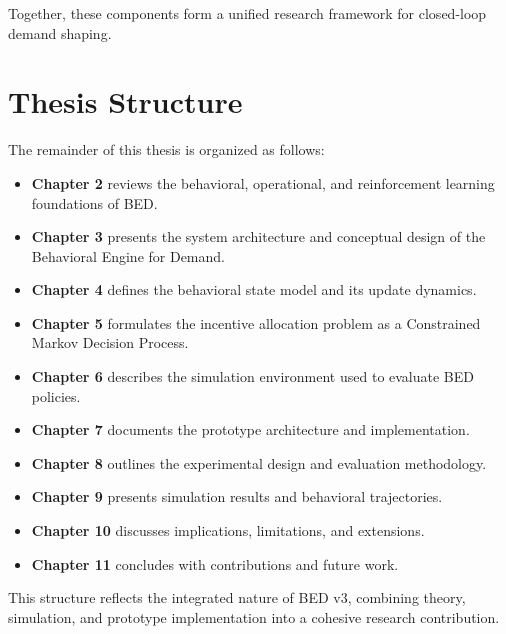 Together, these components form a unified research framework for closed-loop
demand shaping.

\section{Thesis Structure}

The remainder of this thesis is organized as follows:

\begin{itemize}
    \item \textbf{Chapter 2} reviews the behavioral, operational, and
    reinforcement learning foundations of BED.
    \item \textbf{Chapter 3} presents the system architecture and conceptual
    design of the Behavioral Engine for Demand.
    \item \textbf{Chapter 4} defines the behavioral state model and its update
    dynamics.
    \item \textbf{Chapter 5} formulates the incentive allocation problem as a
    Constrained Markov Decision Process.
    \item \textbf{Chapter 6} describes the simulation environment used to
    evaluate BED policies.
    \item \textbf{Chapter 7} documents the prototype architecture and
    implementation.
    \item \textbf{Chapter 8} outlines the experimental design and evaluation
    methodology.
    \item \textbf{Chapter 9} presents simulation results and behavioral
    trajectories.
    \item \textbf{Chapter 10} discusses implications, limitations, and
    extensions.
    \item \textbf{Chapter 11} concludes with contributions and future work.
\end{itemize}

This structure reflects the integrated nature of BED v3, combining theory,
simulation, and prototype implementation into a cohesive research contribution.
